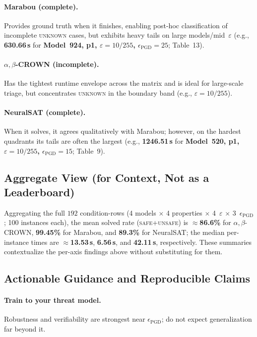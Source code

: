 \paragraph{Marabou (complete).}
Provides ground truth when it finishes, enabling post-hoc classification of incomplete \textsc{unknown} cases, but exhibits heavy tails on large models/mid~$\varepsilon$ (e.g., \textbf{630.66\,s} for \textbf{Model~924, p1, $\varepsilon{=}10/255$, $\epsilon_{\mathrm{PGD}}{=}25$}; Table~13).

\paragraph{$\alpha,\beta$-CROWN (incomplete).}
Has the tightest runtime envelope across the matrix and is ideal for large-scale triage, but concentrates \textsc{unknown} in the boundary band (e.g., $\varepsilon{=}10/255$).

\paragraph{NeuralSAT (complete).}
When it solves, it agrees qualitatively with Marabou; however, on the hardest quadrants its tails are often the largest (e.g., \textbf{1246.51\,s} for \textbf{Model~520, p1, $\varepsilon{=}10/255$, $\epsilon_{\mathrm{PGD}}{=}15$}; Table~9).

\subsection{Aggregate View (for Context, Not as a Leaderboard)}
Aggregating the full $192$ condition-rows (4 models $\times$ 4 properties $\times$ 4~$\varepsilon$ $\times$ 3~$\epsilon_{\mathrm{PGD}}$; 100 instances each), the mean solved rate (\textsc{safe}+\textsc{unsafe}) is $\approx$\textbf{86.6\%} for $\alpha,\beta$-CROWN, \textbf{99.45\%} for Marabou, and \textbf{89.3\%} for NeuralSAT; the median per-instance times are $\approx$\textbf{13.53\,s}, \textbf{6.56\,s}, and \textbf{42.11\,s}, respectively. These summaries contextualize the per-axis findings above without substituting for them.

\subsection{Actionable Guidance and Reproducible Claims}
\paragraph{Train to your threat model.}
Robustness and verifiability are strongest near $\epsilon_{\mathrm{PGD}}$; do not expect generalization far beyond it.

